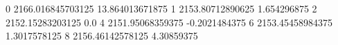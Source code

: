 0 2166.016845703125 13.864013671875
1 2153.80712890625 1.654296875
2 2152.15283203125 0.0
4 2151.95068359375 -0.2021484375
6 2153.45458984375 1.3017578125
8 2156.46142578125 4.30859375
